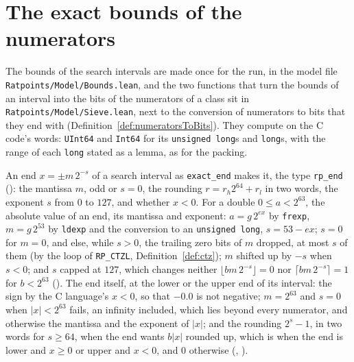 \section{The exact bounds of the numerators}\label{sec:bounds}

The bounds of the search intervals are made once for the run, in the model file
\verb|Ratpoints/Model/Bounds.lean|, and the two functions that turn the bounds of an interval into
the bits of the numerators of a class sit in \verb|Ratpoints/Model/Sieve.lean|, next to the
conversion of numerators to bits that they end with (Definition~\ref{def:numeratorsToBits}). They
compute on the C code's words: \verb|UInt64| and \verb|Int64| for its \verb|unsigned long|s and
\verb|long|s, with the range of each \verb|long| stated as a lemma, as for the packing.

\begin{definition}\label{def:exactEnd}
  \leanok
  An end $x = \pm m\,2^{-s}$ of a search interval as \verb|exact_end| makes it, the type
  \verb|rp_end| (): the mantissa $m$, odd or $s = 0$, the
  rounding $r = r_h 2^{64} + r_l$ in two words, the exponent $s$ from $0$ to $127$, and whether
  $x < 0$. For a double $0 \le a < 2^{63}$, the absolute value of an end, its mantissa and exponent:
  $a = g\,2^{\mathit{ex}}$ by \verb|frexp|, $m = g\,2^{53}$ by \verb|ldexp| and the conversion to an
  \verb|unsigned long|, $s = 53 - \mathit{ex}$; $s = 0$ for $m = 0$, and else, while $s > 0$, the
  trailing zero bits of $m$ dropped, at most $s$ of them (by the loop of \verb|RP_CTZL|,
  Definition~\ref{def:ctz}); $m$ shifted up by $-s$ when $s < 0$; and $s$ capped at $127$, which
  changes neither $\lfloor b m\,2^{-s} \rfloor = 0$ nor $\lceil b m\,2^{-s} \rceil = 1$ for
  $b < 2^{63}$ (). The end itself, at the lower or the upper end
  of its interval: the sign by the C language's $x < 0$, so that $-0.0$ is not negative;
  $m = 2^{63}$ and $s = 0$ when $|x| < 2^{63}$ fails, an infinity included, which lies beyond every
  numerator, and otherwise the mantissa and the exponent of $|x|$; and the rounding $2^s - 1$, in
  two words for $s \ge 64$, when the end wants $b|x|$ rounded up, which is when the end is lower and
  $x \ge 0$ or upper and $x < 0$, and $0$ otherwise (,
  ).
\end{definition}

